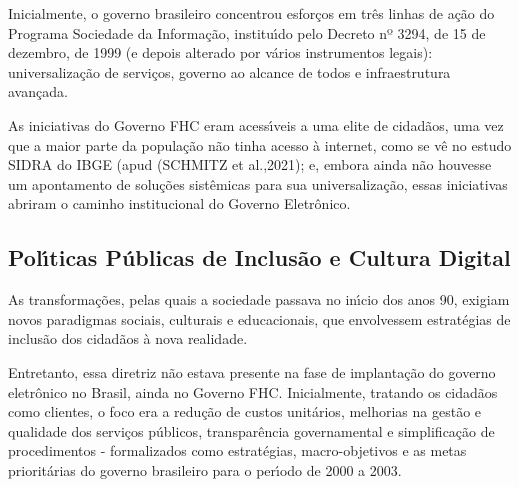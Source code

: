 \documentclass[
12pt,		%
openright,	%
twoside,  %
a4paper,			%
chapter=TITLE,		%
english,			%
french,				%
spanish,			%
brazil				%
]{USPSC-classe/USPSC}
\begin{document}
Inicialmente, o governo brasileiro concentrou esfor\c{c}os em tr\^es linhas de a\c{c}\~ao do Programa Sociedade da Informa\c{c}\~ao, institu\'{\i}do pelo Decreto nº 3294, de 15 de dezembro, de 1999 (e depois alterado por v\'arios instrumentos legais): universaliza\c{c}\~ao de servi\c{c}os, governo ao alcance de todos e infraestrutura avan\c{c}ada.









As iniciativas do Governo FHC eram  acess\'{\i}veis a uma elite de cidad\~aos, uma vez que a maior parte da popula\c{c}\~ao n\~ao tinha acesso \`a internet, como se v\^e no estudo SIDRA do IBGE (apud (SCHMITZ et al.,2021); e, embora ainda n\~ao houvesse um apontamento de solu\c{c}\~oes sist\^emicas para sua universaliza\c{c}\~ao, essas iniciativas abriram o caminho institucional do Governo Eletr\^onico.









\subsection[Pol\'{\i}ticas P\'ublicas de Inclus\~ao e Cultura Digital]{Pol\'{\i}ticas P\'ublicas de Inclus\~ao e Cultura Digital}\label{Pol\'{\i}ticas P\'ublicas de Inclus\~ao e Cultura Digital}
As transforma\c{c}\~oes, pelas quais a sociedade passava no in\'{\i}cio dos anos 90, exigiam novos paradigmas sociais, culturais e educacionais, que envolvessem estrat\'egias de inclus\~ao dos  cidad\~aos \`a nova realidade.









Entretanto, essa diretriz n\~ao estava presente na fase de implanta\c{c}\~ao do governo eletr\^onico no Brasil, ainda no Governo FHC. Inicialmente, tratando os cidad\~aos como clientes, o foco era a redu\c{c}\~ao de custos unit\'arios, melhorias na gest\~ao e qualidade dos servi\c{c}os p\'ublicos, transpar\^encia governamental e simplifica\c{c}\~ao de procedimentos - formalizados como estrat\'egias, macro-objetivos e  as metas priorit\'arias  do governo brasileiro para o per\'{\i}odo de 2000 a 2003.
\end{document}
